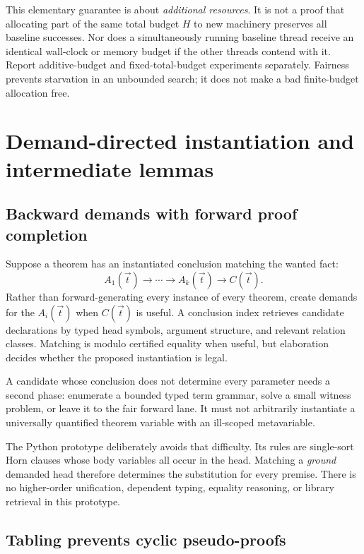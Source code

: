 \documentclass[11pt,a4paper]{article}
\begin{document}
This elementary guarantee is about \emph{additional resources}. It is not a
proof that allocating part of the same total budget $H$ to new machinery
preserves all baseline successes. Nor does a simultaneously running baseline
thread receive an identical wall-clock or memory budget if the other threads
contend with it. Report additive-budget and fixed-total-budget experiments
separately. Fairness prevents starvation in an unbounded search; it does not
make a bad finite-budget allocation free.

\section{Demand-directed instantiation and intermediate lemmas}

\subsection{Backward demands with forward proof completion}

Suppose a theorem has an instantiated conclusion matching the wanted fact:
\[
 A_1(\vec t)\to\cdots\to A_k(\vec t)\to C(\vec t).
\]
Rather than forward-generating every instance of every theorem, create demands
for the $A_i(\vec t)$ when $C(\vec t)$ is useful. A conclusion index retrieves
candidate declarations by typed head symbols, argument structure, and relevant
relation classes. Matching is modulo certified equality when useful, but
elaboration decides whether the proposed instantiation is legal.

A candidate whose conclusion does not determine every parameter needs a second
phase: enumerate a bounded typed term grammar, solve a small witness problem,
or leave it to the fair forward lane. It must not arbitrarily instantiate a
universally quantified theorem variable with an ill-scoped metavariable.

The Python prototype deliberately avoids that difficulty. Its rules are
single-sort Horn clauses whose body variables all occur in the head. Matching
a \emph{ground} demanded head therefore determines the substitution for every
premise. There is no higher-order unification, dependent typing, equality
reasoning, or library retrieval in this prototype.

\subsection{Tabling prevents cyclic pseudo-proofs}
\end{document}
